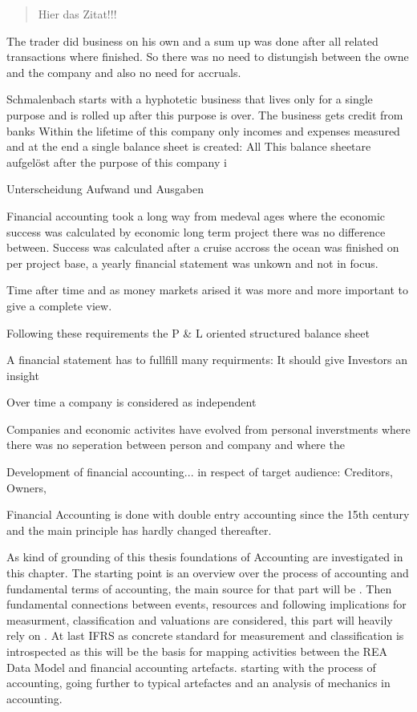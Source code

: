\blockquote[\cite{schmalenbach1962}][]{Hier das Zitat!!!}

The trader did business on his own and a sum up was done after all related transactions where finished.
So there was no need to distungish between the owne and the company and also no need for accruals.

Schmalenbach starts with a hyphotetic business that lives only for a single purpose and is rolled up after this purpose is over.
The business gets credit from banks 
Within the lifetime of this company only incomes and expenses measured and at the end a single balance sheet is created:
All 
This balance sheetare aufgelöst after the purpose of this company i

Unterscheidung Aufwand und Ausgaben


Financial accounting took a long way from medeval ages where the economic success was calculated by economic long term project there was no difference between. Success was calculated after a cruise accross the ocean was finished on per project base, a yearly financial statement was unkown and not in focus.

Time after time and as money markets arised it was more and more important to give a complete view.


Following these requirements the P \& L oriented structured balance sheet 

A financial statement has to fullfill many requirments: It should give Investors an insight

Over time a company is considered as independent 


Companies and economic activites have evolved from personal inverstments where there was no seperation between person and company and where the 

Development of financial accounting... in respect of target audience: Creditors, Owners, 





Financial Accounting is done with double entry accounting since the 15th century  and the main principle has hardly changed thereafter.







As kind of grounding of this thesis foundations of Accounting are investigated in this chapter.
The starting point is an overview over the process of accounting and fundamental terms of accounting, the main source for that part will be \cite{Horngren1984}.
Then fundamental connections between events, resources and following implications for measurment, classification and valuations are considered, this part will heavily rely on \cite{Ijiri1967}.
At last IFRS as concrete standard for measurement and classification is introspected as this will be the basis for mapping activities between the REA Data Model and financial accounting artefacts.
starting with the process of accounting, going further to typical artefactes and an analysis of mechanics in accounting.

